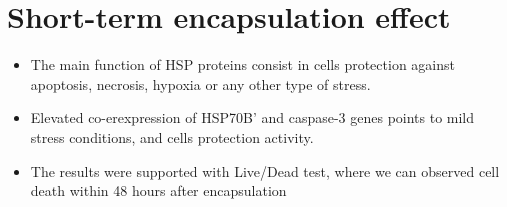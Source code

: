 \section{Short-term encapsulation effect}

\begin{multicols}{2}
    \begin{itemize}
        \item The main function of HSP proteins consist in cells protection against apoptosis, necrosis, hypoxia or any other type of stress.
        \item Elevated co-erexpression of HSP70B' and caspase-3 genes points to mild stress conditions, and cells protection activity.
        \item The results were supported with Live/Dead test, where we can observed cell death within 48 hours after encapsulation
    \end{itemize}
\end{multicols}


